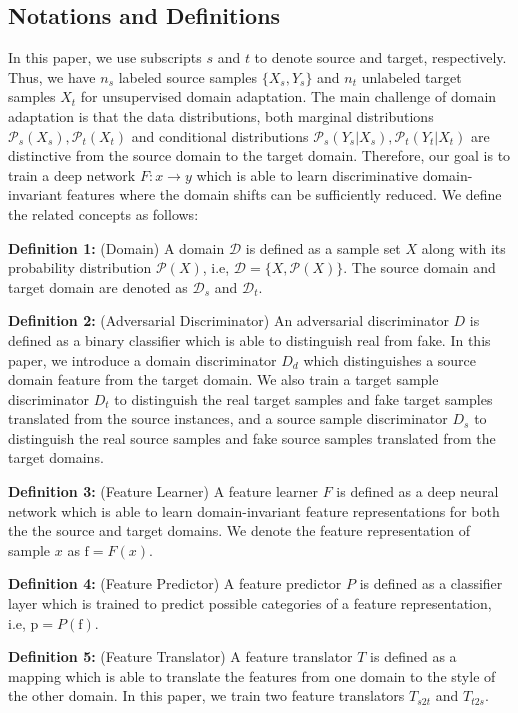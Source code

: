 \documentclass[sigconf]{acmart}
\begin{document}
\subsection{Notations and Definitions}
In this paper, we use subscripts $s$ and $t$ to denote source and target, respectively. Thus, we have $n_s$ labeled source samples $\{X_s,Y_s\}$ and $n_t$ unlabeled target samples $X_t$ for unsupervised domain adaptation. The main challenge of domain adaptation is that the data distributions, both marginal distributions $\mathcal{P}_s(X_s), \mathcal{P}_t(X_t)$ and conditional distributions $\mathcal{P}_s(Y_s|X_s), \mathcal{P}_t(Y_t|X_t)$ are distinctive from the source domain to the target domain. Therefore, our goal is to train a deep network $F:x\rightarrow y$ which is able to learn discriminative domain-invariant features where the domain shifts can be sufficiently reduced. We define the related concepts as follows:



{\bf Definition 1:} ({Domain}) A domain $\mathcal{D}$ is defined as a sample set $X$ along with its probability distribution $\mathcal{P}(X)$, i.e, $\mathcal{D}=\{X,\mathcal{P}(X)\}$. The source domain and target domain are denoted as $\mathcal{D}_s$ and $\mathcal{D}_t$.

{\bf Definition 2:} (Adversarial Discriminator) An adversarial discriminator $D$ is defined as a binary classifier which is able to distinguish real from fake. In this paper, we introduce a domain discriminator $D_d$ which distinguishes a source domain feature from the target domain. We also train a target sample discriminator $D_t$ to distinguish the real target samples and fake target samples translated from the source instances, and a source sample discriminator $D_s$ to distinguish the real source samples and fake source samples translated from the target domains.

{\bf Definition 3:} (Feature Learner) A feature learner $F$ is defined as a deep neural network which is able to learn domain-invariant feature representations for both the the source and target domains. We denote the feature representation of sample $x$ as $\mathrm{f}=F(x)$.

{\bf Definition 4:} (Feature Predictor) A feature predictor $P$ is defined as a classifier layer which is trained to predict possible categories of a feature representation, i.e, $\mathrm{p}=P(\mathrm{f})$.

{\bf Definition 5:} (Feature Translator) A feature translator $T$ is defined as a mapping which is able to translate the features from one domain to the style of the other domain. In this paper, we train two feature translators $T_{s2t}$ and $T_{t2s}$. 
\end{document}
